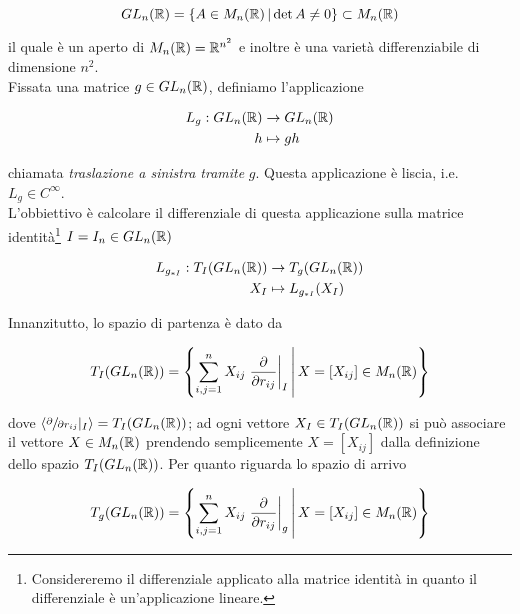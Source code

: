 \begin{equation}
	GL_{n}(\mathbb{R}) = \left\{ A \in M_{n}(\mathbb{R}) \, \middle| \, \det A \neq 0 \right\} \subset M_{n}(\mathbb{R})
\end{equation}

il quale è un aperto di $ M_{n}(\mathbb{R}) = \mathbb{R}^{n^{2}} $ e inoltre è una varietà differenziabile di dimensione $ n^{2} $.\\
Fissata una matrice $ g \in GL_{n}(\mathbb{R}) $, definiamo l'applicazione

\begin{align}
	\begin{split}
		L_{g} : GL_{n}(\mathbb{R}) &\to GL_{n}(\mathbb{R})\\
		h &\mapsto g h
	\end{split}
\end{align}

chiamata \textit{traslazione a sinistra tramite} $ g $. Questa applicazione è liscia, i.e. $ L_{g} \in C^{\infty} $.\\
L'obbiettivo è calcolare il differenziale di questa applicazione sulla matrice identità\footnote{%
	Considereremo il differenziale applicato alla matrice identità in quanto il differenziale è un'applicazione lineare.%
} $ I = I_{n} \in GL_{n}(\mathbb{R}) $

\begin{align}
	\begin{split}
		L_{g_{*I}} : T_{I}(GL_{n}(\mathbb{R})) &\to T_{g}(GL_{n}(\mathbb{R}))\\
		X_{I} &\mapsto L_{g_{*I}}(X_{I})
	\end{split}
\end{align}

Innanzitutto, lo spazio di partenza è dato da

\begin{equation}
	T_{I}(GL_{n}(\mathbb{R})) = \left\{ \sum_{i,j=1}^{n} X_{ij} \left. \dfrac{\partial}{\partial r_{ij}} \right|_{I} \, \middle| \, X=[X_{ij}] \in M_{n}(\mathbb{R}) \right\}
\end{equation}

dove $ \langle \sfrac{\partial}{\partial r_{ij}} |_{I} \rangle = T_{I}(GL_{n}(\mathbb{R})) $; ad ogni vettore $ X_{I} \in T_{I}(GL_{n}(\mathbb{R})) $ si può associare il vettore $ X \in M_{n}(\mathbb{R}) $ prendendo semplicemente $ X=[X_{ij}] $ dalla definizione dello spazio $ T_{I}(GL_{n}(\mathbb{R})) $. Per quanto riguarda lo spazio di arrivo

\begin{equation}
	T_{g}(GL_{n}(\mathbb{R})) = \left\{ \sum_{i,j=1}^{n} X_{ij} \left. \dfrac{\partial}{\partial r_{ij}} \right|_{g} \, \middle| \, X=[X_{ij}] \in M_{n}(\mathbb{R}) \right\}
\end{equation}

